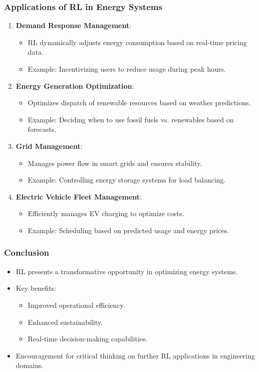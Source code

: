 \documentclass[aspectratio=169]{beamer}
\begin{document}
\begin{frame}[fragile]
  \frametitle{Applications of RL in Energy Systems}
  \begin{enumerate}
    \item \textbf{Demand Response Management}:
      \begin{itemize}
        \item RL dynamically adjusts energy consumption based on real-time pricing data.
        \item Example: Incentivizing users to reduce usage during peak hours.
      \end{itemize}

    \item \textbf{Energy Generation Optimization}:
      \begin{itemize}
        \item Optimizes dispatch of renewable resources based on weather predictions.
        \item Example: Deciding when to use fossil fuels vs. renewables based on forecasts.
      \end{itemize}

    \item \textbf{Grid Management}:
      \begin{itemize}
        \item Manages power flow in smart grids and ensures stability.
        \item Example: Controlling energy storage systems for load balancing.
      \end{itemize}

    \item \textbf{Electric Vehicle Fleet Management}:
      \begin{itemize}
        \item Efficiently manages EV charging to optimize costs.
        \item Example: Scheduling based on predicted usage and energy prices.
      \end{itemize}
  \end{enumerate}
\end{frame}

\begin{frame}[fragile]
  \frametitle{Conclusion}
  \begin{itemize}
    \item RL presents a transformative opportunity in optimizing energy systems.
    \item Key benefits:
      \begin{itemize}
        \item Improved operational efficiency.
        \item Enhanced sustainability.
        \item Real-time decision-making capabilities.
      \end{itemize}
    \item Encouragement for critical thinking on further RL applications in engineering domains.
  \end{itemize}
\end{frame}
\end{document}
